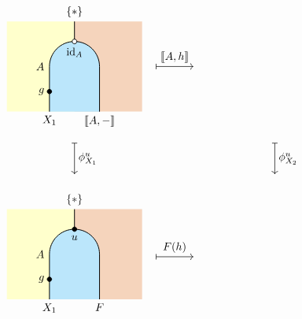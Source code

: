 \[
    \begin{tikzpicture}[x=0.8cm,y=0.8cm, line width=0.7pt, hollow/.style={
            circle,
            fill=white,
            draw,
            outer sep=0pt,
            inner sep=1.5pt,
            line width=0.7pt
          }]
         \definecolor{leftcolor}{RGB}{255,255,204}
    \definecolor{midcolor}{HTML}{BBE6FB}
    \definecolor{rightcolor}{HTML}{F5D4BC}

    \draw [|-To, line width=0.5pt] (-4.75,-5.8) -- (-3.25,-5.8) node[midway,above] {$F(h)$};
    \draw [|-To, line width=0.5pt] (0,-1.25) -- (0,-2.5) node[midway,right] {$\phi^u_{X_2}$};
    \draw [|-To, line width=0.5pt] (-4.75,1.8) -- (-3.25,1.8) node[midway,above] {$\llbracket A , h\rrbracket$};
    \draw [|-To, line width=0.5pt] (-8,-1.25) -- (-8,-2.5) node[midway,right] {$\phi^u_{X_1}$};  

    \begin{scope}[shift={(-8,0)}]
        \begin{scope} 
            \clip (-2.7,0) rectangle (2.7, 3.6);     
            \fill[fill=leftcolor] (-3,0) rectangle (0, 4);  
            \fill[fill=rightcolor] (0,0) rectangle (3, 4);  
            \draw[fill=midcolor, rounded corners=0.8cm, line width=0.7pt] (-1, -2) rectangle (1, 2.8);
        \end{scope}
        \draw (0, 3.6) -- (0,2.8);
        \filldraw [black] (-1,0.8) circle (2pt) node[left=1pt] {$g$};
        \node[below] at (-1, 0) {$X_1$};
        \node[left=1pt] at (-1, 1.8) {$A$};
        \node[below] at (1, 0) {$\llbracket A , -\rrbracket$};
        \node[hollow] at (0, 2.8) {};
        \node[below=2pt] at (0, 2.8) {$\mathrm{id}_A$}; 
        \node[above] at (0, 3.6) {$\{*\}$};
    \end{scope}

    \begin{scope}[shift={(-8,-7.5)}]
       \begin{scope} 
            \clip (-2.7,0) rectangle (2.7, 3.6);     
            \fill[fill=leftcolor] (-3,0) rectangle (0, 4);  
            \fill[fill=rightcolor] (0,0) rectangle (3, 4);  
            \draw[fill=midcolor, rounded corners=0.8cm, line width=0.7pt] (-1, -2) rectangle (1, 2.8);
        \end{scope}
        \draw (0, 3.6) -- (0,2.8);
        \filldraw [black] (-1,0.8) circle (2pt) node[left=1pt] {$g$};
        \filldraw [black] (0, 2.8) circle (2pt) node[below=2pt] {$u$};
        \node[below] at (-1, 0) {$X_1$};
        \node[left=1pt] at (-1, 1.8) {$A$};
        \node[below] at (1, 0) {$F$};
        \node[above] at (0, 3.6) {$\{*\}$};
    \end{scope}


\end{tikzpicture}\]
